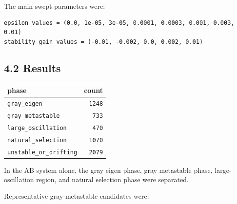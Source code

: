\documentclass{article}
\newcounter{none}
\begin{document}
The main swept parameters were:

\begin{verbatim}
epsilon_values = (0.0, 1e-05, 3e-05, 0.0001, 0.0003, 0.001, 0.003, 0.01)
stability_gain_values = (-0.01, -0.002, 0.0, 0.002, 0.01)
\end{verbatim}

\subsection{4.2 Results}\label{results}

{\def\LTcaptype{none} %
\begin{longtable}[]{@{}lr@{}}
\toprule\noalign{}
phase & count \\
\midrule\noalign{}
\endhead
\bottomrule\noalign{}
\endlastfoot
\texttt{gray\_eigen} & \texttt{1248} \\
\texttt{gray\_metastable} & \texttt{733} \\
\texttt{large\_oscillation} & \texttt{470} \\
\texttt{natural\_selection} & \texttt{1070} \\
\texttt{unstable\_or\_drifting} & \texttt{2079} \\
\end{longtable}
}

In the AB system alone, the gray eigen phase, gray metastable phase,
large-oscillation region, and natural selection phase were separated.

Representative gray-metastable candidates were:
\end{document}
